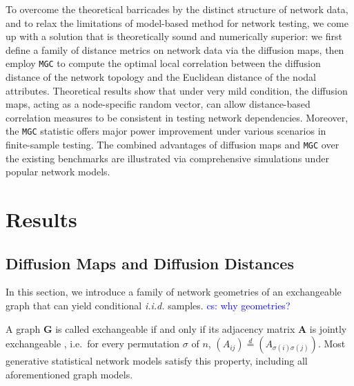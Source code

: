 \documentclass[11pt]{article}
\theoremstyle{definition}
\newcommand{\cs}[1]{\textcolor{blue}{cs: #1}}
\begin{document}
To overcome the theoretical barricades by the distinct structure of network data, and to relax the limitations of model-based method for network testing, we come up with a solution that is theoretically sound and numerically superior: we first define a family of distance metrics on network data via the diffusion maps, then employ \texttt{MGC} to compute the optimal local correlation between the diffusion distance of the network topology and the Euclidean distance of the nodal attributes. Theoretical results show that under very mild condition, the diffusion maps, acting as a node-specific random vector, can allow distance-based correlation measures to be consistent in testing network dependencies. Moreover, the \texttt{MGC} statistic offers major power improvement under various scenarios in finite-sample testing. The combined advantages of diffusion maps and \texttt{MGC} over the existing benchmarks are illustrated via comprehensive simulations under popular network models.

	\vspace*{-0.2cm}
\section{Results}
\label{sec:method}
	\vspace*{-0.2cm}
\subsection{Diffusion Maps and Diffusion Distances}
\label{ssec:method2}

In this section, we introduce a family of network geometries of an exchangeable graph \cite{coifman2006diffusion} that can yield conditional \textit{i.i.d.} samples.
\cs{why geometries?}

A graph $\mathbf{G}$ is called exchangeable if and only if its adjacency matrix $\mathbf{A}$ is jointly exchangeable \cite{orbanz2015bayesian}, i.e.~for every permutation $\sigma$ of $n$, $(A_{ij}) \stackrel{d}{=} (A_{\sigma(i) \sigma(j)})$. Most generative statistical network models satisfy this property, including all aforementioned graph models.
\end{document}
